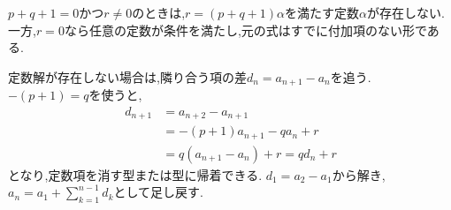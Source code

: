     $p+q+1=0$かつ$r\ne0$のときは,$r=(p+q+1)\alpha$を満たす定数$\alpha$が存在しない.
    一方,$r=0$なら任意の定数が条件を満たし,元の式はすでに付加項のない形である.

    定数解が存在しない場合は,隣り合う項の差$d_n=a_{n+1}-a_n$を追う.
    $-(p+1)=q$を使うと,
    \[
      \begin{aligned}
        d_{n+1}&=a_{n+2}-a_{n+1}\\
        &=-(p+1)a_{n+1}-qa_n+r\\
        &=q(a_{n+1}-a_n)+r=qd_n+r
      \end{aligned}
    \]
    となり,定数項を消す型または型に帰着できる.
    $d_1=a_2-a_1$から解き,$a_n=a_1+\sum_{k=1}^{n-1}d_k$として足し戻す.
